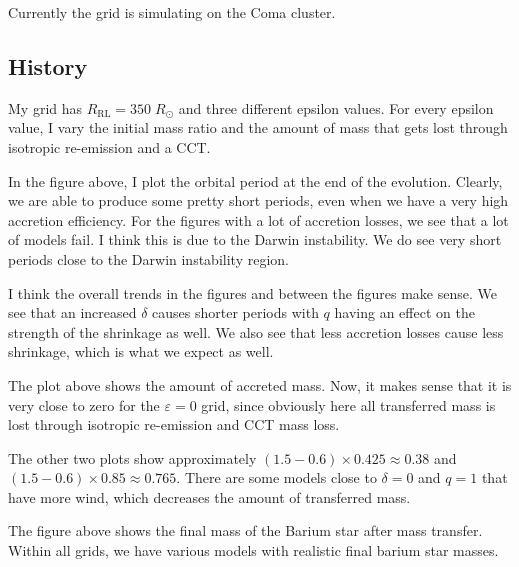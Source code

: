 \documentclass[a4paper,10pt]{article}
\begin{document}
Currently the grid is simulating on the Coma cluster.

\label{sec:grid}

\subsection{History}
My grid has \(R_\text{RL} = 350\;R_\odot \) and three different epsilon values. For every epsilon value, I vary the initial mass ratio and the amount of mass that gets lost through isotropic re-emission and a CCT.

\begin{figure}[ht]
    \centering
\end{figure}

In the figure above, I plot the orbital period at the end of the evolution. Clearly, we are able to produce some pretty short periods, even when we have  a very high accretion efficiency. For the figures with a lot of accretion losses, we see that a lot of models fail. I think this is due to the Darwin instability. We do see very short periods close to the Darwin instability region.

I think the overall trends in the figures and between the figures make sense. We see that an increased \(\delta \) causes shorter periods with \(q\) having an effect on the strength of the shrinkage as well. We also see that less accretion losses cause less shrinkage, which is what we expect as well.


\begin{figure}[ht]
    \centering
\end{figure}

The plot above shows the amount of accreted mass. Now, it makes sense that it is very close to zero for the \(\varepsilon =0\) grid, since obviously here all transferred mass is lost through isotropic re-emission and CCT mass loss.

The other two plots show approximately \((1.5 - 0.6) \times 0.425 \approx 0.38\) and \((1.5 - 0.6) \times 0.85 \approx 0.765\). There are some models close to \(\delta  = 0\) and \(q = 1\) that have more wind, which decreases the amount of transferred mass.

\begin{figure}[ht]
    \centering
\end{figure}

The figure above shows the final mass of the Barium star after mass transfer. Within all grids, we have various models with realistic final barium star masses.
\end{document}
